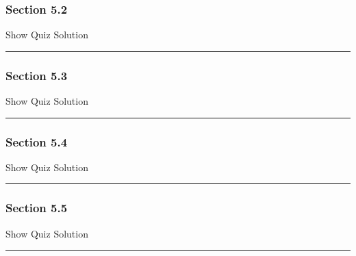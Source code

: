 \documentclass[]{article}
\begin{document}
\subsubsection{Section 5.2}\label{section-5.2}

\hypertarget{surveyElement52}{}

\hypertarget{surveyResult52}{}

Show Quiz Solution

\hypertarget{display.Quiz52.2}{}
\begin{center}\rule{0.5\linewidth}{\linethickness}\end{center}

\subsubsection{Section 5.3}\label{section-5.3}

\hypertarget{surveyElement53}{}

\hypertarget{surveyResult53}{}

Show Quiz Solution

\hypertarget{display.Quiz53.2}{}
\begin{center}\rule{0.5\linewidth}{\linethickness}\end{center}

\subsubsection{Section 5.4}\label{section-5.4}

\hypertarget{surveyElement54}{}

\hypertarget{surveyResult54}{}

Show Quiz Solution

\hypertarget{display.Quiz54.2}{}
\begin{center}\rule{0.5\linewidth}{\linethickness}\end{center}

\subsubsection{Section 5.5}\label{section-5.5}

\hypertarget{surveyElement55}{}

\hypertarget{surveyResult55}{}

Show Quiz Solution

\hypertarget{display.Quiz55.2}{}
\begin{center}\rule{0.5\linewidth}{\linethickness}\end{center}
\end{document}
